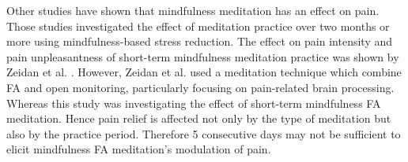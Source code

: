 Other studies have shown that mindfulness meditation has an effect on pain. Those studies investigated the effect of meditation practice over two months or more using mindfulness-based stress reduction. \cite{Kabat1982,Rosenzweig2010} The effect on pain intensity and pain unpleasantness of short-term mindfulness meditation practice was shown by Zeidan et al. \cite{Zeidan2012}. However, Zeidan et al. \cite{Zeidan2012} used a meditation technique which combine FA and open monitoring, particularly focusing on pain-related brain processing. Whereas this study was investigating the effect of short-term mindfulness FA meditation. Hence pain relief is affected not only by the type of meditation but also by the practice period. Therefore 5 consecutive days may not be sufficient to elicit mindfulness FA meditation’s modulation of pain.